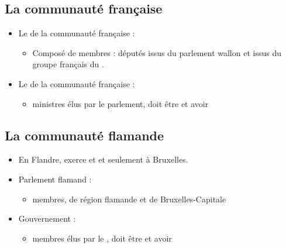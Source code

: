 \subsection{La communauté française}
\begin{itemize}
	\item Le  de la communauté française :
	\begin{itemize}
		\item Composé de  membres :  députés issus du parlement wallon et  issus du groupe français du .
	\end{itemize}
	\item Le  de la communauté française :
	\begin{itemize}
		\item {} ministres  élus par le parlement, doit être  et avoir 
	\end{itemize}
\end{itemize}

\subsection{La communauté flamande}
\begin{itemize}
	\item En Flandre, exerce  et  et seulement  à Bruxelles.
	\item Parlement flamand :
	\begin{itemize}
		\item {} membres,  de région flamande et  de Bruxelles-Capitale
	\end{itemize}
	\item Gouvernement :
	\begin{itemize}
		\item {} membres  élus par le , doit être  et avoir 
	\end{itemize}
\end{itemize}

